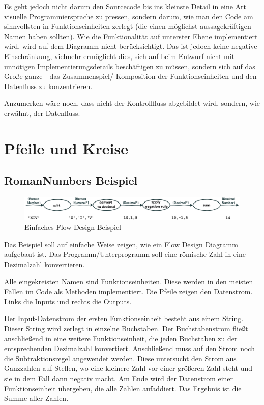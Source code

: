 Es geht jedoch nicht darum den Sourcecode bis ins kleinste Detail in eine Art visuelle Programmiersprache zu pressen,
sondern darum, wie man den Code am sinnvollsten in Funktionseinheiten zerlegt (die einen möglichst aussagekräftigen Namen haben sollten).
Wie die Funktionalität auf unterster Ebene implementiert wird, wird auf dem Diagramm nicht berücksichtigt.
Das ist jedoch keine negative Einschränkung, vielmehr ermöglicht dies, sich auf beim Entwurf nicht mit unnötigen Implementierungsdetails beschäftigen zu
müssen, sondern sich auf das Große ganze - das Zusammenspiel/ Komposition der Funktionseinheiten und den Datenfluss zu konzentrieren.


Anzumerken wäre noch, dass nicht der Kontrollfluss abgebildet wird, sondern, wie erwähnt, der Datenfluss.


\chapter{Pfeile und Kreise}

\section{RomanNumbers Beispiel}

\begin{center}
\begin{figure}[H]
	\includegraphics[width=1.0\linewidth]{./img/FromRomanNumerals.png}
	\caption{Einfaches Flow Design Beispiel}
\end{figure}
\end{center}




Das Beispiel soll auf einfache Weise zeigen, wie ein Flow Design Diagramm aufgebaut ist.
Das Programm/Unterprogramm soll eine römische Zahl in eine Dezimalzahl konvertieren.

Alle eingekreisten Namen sind Funktionseinheiten.
Diese werden in den meisten Fällen im Code als Methoden implementiert.
Die Pfeile zeigen den Datenstrom. Links die Inputs und rechts die Outputs.


Der Input-Datenstrom der ersten Funktionseinheit besteht aus einem String. Dieser String wird zerlegt in einzelne Buchstaben.
Der Buchstabenstrom fließt anschließend in eine weitere Funktionseinheit, die jeden Buchstaben zu der entsprechenden
Dezimalzahl konvertiert. Anschließend muss auf den Strom noch die Subtraktionsregel angewendet werden. Diese untersucht den
Strom aus Ganzzahlen auf Stellen, wo eine kleinere Zahl vor einer größeren Zahl steht und sie in dem Fall dann negativ macht.
Am Ende wird der Datenstrom einer Funktionseinheit übergeben, die alle Zahlen aufaddiert.
Das Ergebnis ist die Summe aller Zahlen.


